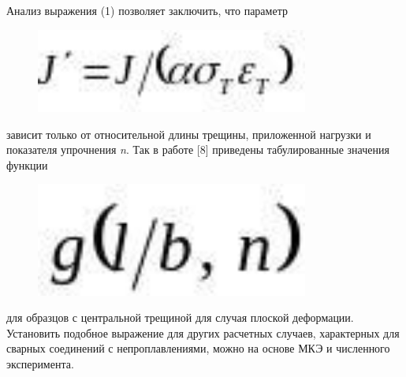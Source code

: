 Анализ выражения (1) позволяет заключить, что параметр
\begin{figure}[H]
	\centering
	\includegraphics[width=0.8\textwidth]{assets/1157}
	\caption*{}
\end{figure} зависит только от относительной
длины трещины, приложенной нагрузки и показателя упрочнения \emph{n}.
Так в работе {[}8{]} приведены табулированные значения функции
\begin{figure}[H]
	\centering
	\includegraphics[width=0.8\textwidth]{assets/1158}
	\caption*{}
\end{figure} для образцов с центральной трещиной
для случая плоской деформации. Установить подобное выражение для других
расчетных случаев, характерных для сварных соединений с
непроплавлениями, можно на основе МКЭ и численного эксперимента.

